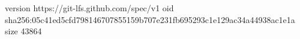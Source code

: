 version https://git-lfs.github.com/spec/v1
oid sha256:05c41ed5cfd798146707855159b707e231fb695293c1e129ac34a44938ac1e1a
size 43864
